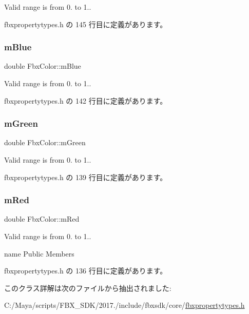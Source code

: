 Valid range is from 0. to 1.. 



 fbxpropertytypes.\+h の 145 行目に定義があります。

\mbox{\label{class_fbx_color_abf621ccd7dc31e50019c7bdde90dfe5e}} 
\subsubsection{\texorpdfstring{m\+Blue}{mBlue}}
{\footnotesize\ttfamily double Fbx\+Color\+::m\+Blue}



Valid range is from 0. to 1.. 



 fbxpropertytypes.\+h の 142 行目に定義があります。

\mbox{\label{class_fbx_color_a43ba888941f635304a7ed885ccfed776}} 
\subsubsection{\texorpdfstring{m\+Green}{mGreen}}
{\footnotesize\ttfamily double Fbx\+Color\+::m\+Green}



Valid range is from 0. to 1.. 



 fbxpropertytypes.\+h の 139 行目に定義があります。

\mbox{\label{class_fbx_color_aa58094c2415fa965bdf1e760892baa5c}} 
\subsubsection{\texorpdfstring{m\+Red}{mRed}}
{\footnotesize\ttfamily double Fbx\+Color\+::m\+Red}



Valid range is from 0. to 1.. 

name Public Members 

 fbxpropertytypes.\+h の 136 行目に定義があります。



このクラス詳解は次のファイルから抽出されました\+:\begin{DoxyCompactItemize}
\item 
C\+:/\+Maya/scripts/\+F\+B\+X\+\_\+\+S\+D\+K/2017./include/fbxsdk/core/\hyperlink{fbxpropertytypes_8h}{fbxpropertytypes.\+h}\end{DoxyCompactItemize}
